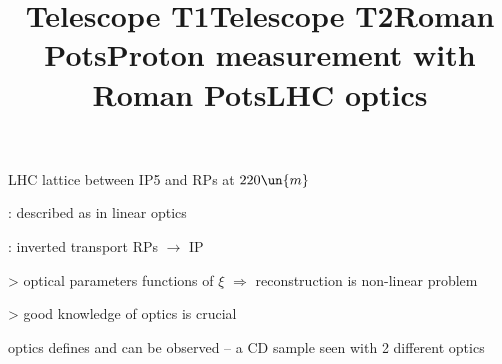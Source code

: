 \vfil

\newpage %
\title{Telescope T1}



\newpage %
\title{Telescope T2}



\newpage %
\title{Roman Pots}


\newpage %
\title{Proton measurement with Roman Pots}

\vskip-5mm

\> LHC lattice between IP5 and RPs at $220\un{m}$

\vskip1mm

\> : described as in linear optics


\vskip1mm	

\> : inverted transport RPs $\longrightarrow$ IP

\>> optical parameters functions of $\xi$ $\Rightarrow$ reconstruction is non-linear problem

\>> \cYe good knowledge of optics is crucial\cFg


\newpage %
\title{LHC optics}

\> optics defines  and  can be observed -- a CD sample seen with 2 different optics

